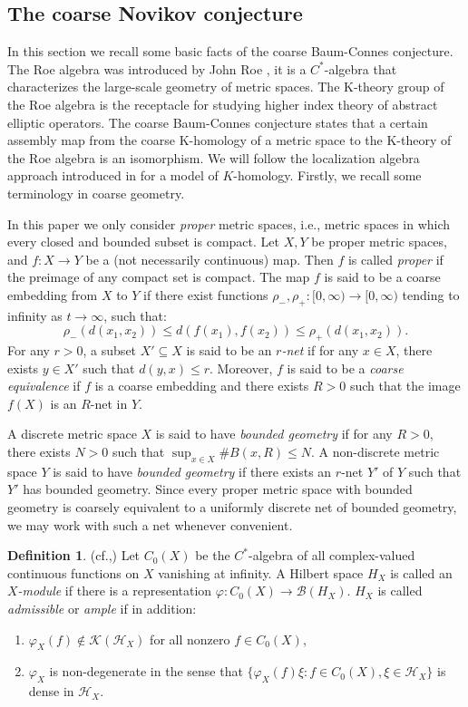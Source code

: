 \documentclass{article}
\theoremstyle{plain}
\theoremstyle{definition}
\newtheorem{definition}[theorem]{Definition}
\theoremstyle{remark}
\def\B{\mathcal B}
\def\K{\mathcal K}
\def\H{\mathcal H}
\begin{document}
	\subsection{The coarse Novikov conjecture}
	
	In this section we recall some basic facts of the coarse Baum-Connes conjecture. The Roe algebra was introduced by John Roe \cite{roe1993coarse}, it is a $C^*$-algebra that characterizes the large-scale geometry of metric spaces. The K-theory group of the Roe algebra is the receptacle for studying higher index theory of abstract elliptic operators. The coarse Baum-Connes conjecture states that a certain assembly map from the coarse K-homology of a metric space to the K-theory of the Roe algebra is an isomorphism. We will follow the localization algebra approach introduced in \cite{yu1997localization} for a model of $K$-homology. Firstly, we recall some terminology in coarse geometry. 
	
	In this paper we only consider \emph{proper} metric spaces, i.e., metric spaces in which every closed and bounded subset is compact. Let $X, Y$ be proper metric spaces, and $f: X\to Y$ be a (not necessarily continuous) map. Then $f$ is called \emph{proper} if the preimage of any compact set is compact. The map $f$ is said to be a coarse embedding from $X$ to $Y$ if there exist functions $\rho_-,\rho_+:[0,\infty)\to[0,\infty)$ tending to infinity as $t\to \infty$, such that:
	$$\rho_-(d(x_1,x_2))\leq d(f(x_1),f(x_2))\leq \rho_+(d(x_1,x_2)).$$
	For any $r>0$, a subset $X'\subseteq X$ is said to be an \emph{$r$-net} if for any $x\in X$, there exists $y\in X'$ such that $d(y,x)\leq r$.
	Moreover, $f$ is said to be a \emph{coarse equivalence} if $f$ is a coarse embedding and there exists $R>0$ such that the image $f(X)$ is an $R$-net in $Y$.
	
	A discrete metric space $X$ is said to have \emph{bounded geometry} if for any $R>0$, there exists $N>0$ such that $\sup_{x\in X}\#B(x, R)\leq N$. A non-discrete metric space $Y$ is said to have \emph{bounded geometry} if there exists an $r$-net $Y'$ of $Y$ such that $Y'$ has bounded geometry. Since every proper metric space with bounded geometry is coarsely equivalent to a uniformly discrete net of bounded geometry, we may work with such a net whenever convenient.
	\begin{definition}(cf.\cite{willett2020higher},\cite{kasparov2012novikov})
		Let $C_0(X)$ be the $C^*$-algebra of all complex-valued continuous functions on $X$ vanishing at infinity. A Hilbert space $H_X$ is called an \emph{$X$-module} if there is a representation $\varphi:C_0(X)\to\B(H_X)$. $H_X$ is called \emph{admissible} or \emph{ample} if in addition:
		\begin{enumerate}
			\item $\varphi_X(f)\notin \K(\H_X)$ for all nonzero $f\in C_0(X)$,
			\item $\varphi_X$ is non-degenerate in the sense that $\{\varphi_X(f) \xi: f\in C_0(X), \xi\in \H_X\}$ is dense in $\H_X$. 
		\end{enumerate}
	\end{definition}
	
\end{document}
